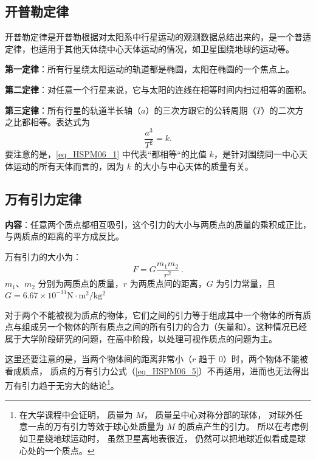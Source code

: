 

\subsection{开普勒定律}

开普勒定律是开普勒根据对太阳系中行星运动的观测数据总结出来的，是一个普适定律，也适用于其他天体绕中心天体运动的情况，如卫星围绕地球的运动等。

\textbf{第一定律}：所有行星绕太阳运动的轨道都是椭圆，太阳在椭圆的一个焦点上。

\textbf{第二定律}：对任意一个行星来说，它与太阳的连线在相等时间内扫过相等的面积。

\textbf{第三定律}：所有行星的轨道半长轴（$a$）的三次方跟它的公转周期（$T$）的二次方之比都相等。表达式为
\begin{equation}\label{eq_HSPM06_1}
\frac{a^3}{T^2}=k.
\end{equation}
要注意的是，\autoref{eq_HSPM06_1} 中代表“都相等“的比值 $k$，是针对围绕同一中心天体运动的所有天体而言的，因为 $k$ 的大小与中心天体的质量有关。

\subsection{万有引力定律}\label{sub_HSPM06_1}

\textbf{内容}：任意两个质点都相互吸引，这个引力的大小与两质点的质量的乘积成正比，与两质点的距离的平方成反比。

万有引力的大小为：
\begin{equation}\label{eq_HSPM06_5}
F=G\frac{m_1m_2}{r^2}~.
\end{equation}
$m_1$、$m_2$ 分别为两质点的质量，$r$ 为两质点间的距离，$G$ 为引力常量，且 $G=6.67\times 10^{-11}\mathrm{N\cdot m^2/kg^2}$

对于两个不能被视为质点的物体，它们之间的引力等于组成其中一个物体的所有质点与组成另一个物体的所有质点之间的所有引力的合力（矢量和）。这种情况已经属于大学阶段研究的问题，在高中阶段，以处理可视作质点的问题为主。

这里还要注意的是，当两个物体间的距离非常小（$r$ 趋于 $0$）时，两个物体不能被看成质点， 质点的万有引力公式（\autoref{eq_HSPM06_5}）不再适用，进而也无法得出万有引力趋于无穷大的结论\footnote{在大学课程中会证明， 质量为 $M$， 质量呈中心对称分部的球体， 对球外任意一点的万有引力等效于球心处质量为 $M$ 的质点产生的引力。 所以在考虑例如卫星绕地球运动时， 虽然卫星离地表很近， 仍然可以把地球近似看成是球心处的一个质点。}。

